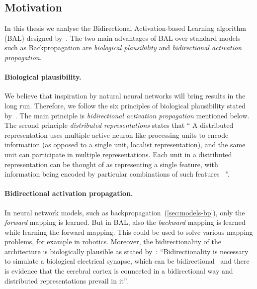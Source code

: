 
\subsection*{Motivation}
\label{sec:motivation} 
In this thesis we analyse the Bidirectional Activation-based Learning algorithm (BAL) designed by~\citet{farkas2013bal}. The two main advantages of BAL over standard models such as Backpropagation are \emph{biological plausibility} and \emph{bidirectional activation propagation}.

\paragraph{Biological plausibility.} We believe that inspiration by natural neural networks will bring results in the long run. Therefore, we follow the six principles of biological plausibility stated by~\citet{hinton1988learning}. The main principle is \emph{bidirectional activation propagation} mentioned below. The second principle \emph{distributed representations} states that \enquote{
  A distributed representation uses multiple active neuron like processing units to encode information (as opposed to a single unit, localist representation), and the same unit can participate in multiple representations. Each unit in a distributed representation can be thought of as representing a single feature, with information being encoded by particular combinations of such features~\citep[pp.~ 456]{o1998six}
}. %

\paragraph{Bidirectional activation propagation.} In neural network models, such as backpropagation~(\ref{sec:models-bp}), only the \emph{forward} mapping is learned. But in BAL, also the \emph{backward} mapping is learned while learning the forward mapping. This could be used to solve various mapping problems, for example in robotics. Moreover, the bidirectionality of the architecture is biologically plausible as stated by~\citet{da2011advances}: \enquote{Bidirectionality is necessary to simulate a biological electrical synapse, which can be bidirectional~\citep{rosa2002biologically} and there is evidence that the cerebral cortex is connected in a bidirectional way and distributed representations prevail in it}. 


